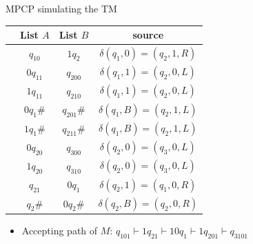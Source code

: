\documentclass[handout]{beamer}
\begin{document}
\begin{frame}{MPCP simulating the TM}

    \small

    \begin{minipage}{0.65\textwidth}
        \begin{tabular}{c  c |c| c }
         & List $A$ & List $B$ & source\\
        \hline
         & {\cellcolor{blue} $q_10$} & \cellcolor{blue}$1q_2$ &  $\delta(q_1,0)=(q_2,1,R)$ \\
         & $0q_11$ & $q_200$ & $\delta(q_1,1)=(q_2,0,L)$ \\
         & $1q_11$ & $q_210$ & $\delta(q_1,1)=(q_2,0,L)$ \\
         & {\cellcolor{violet}$0q_1\#$} & \cellcolor{violet}$q_201\#$ & $\delta(q_1,B)=(q_2,1,L)$ \\
         & $1q_1\#$ & $q_211\#$ & $\delta(q_1,B)=(q_2,1,L)$ \\
         & $0q_20$ & $q_300$ & $\delta(q_2,0)=(q_3,0,L)$ \\
         & {\cellcolor{orange} $1q_20$} & \cellcolor{orange}$q_310$ & $\delta(q_2,0)=(q_3,0,L)$ \\
         & {\cellcolor{red}$q_21$} & \cellcolor{red}$0q_1$ & $\delta(q_2,1)=(q_1,0,R)$ \\
         & $q_2\#$ & $0q_2\#$ & $\delta(q_2,B)=(q_2,0,R)$ \\
        \hline
        \end{tabular}
        
        \begin{itemize}
            \item Accepting path of $M$: $q_101\vdash 1q_21 \vdash 10q_1 \vdash 1q_201 \vdash q_3101$
        \end{itemize}
        

\end{minipage}
\end{frame}
\end{document}
